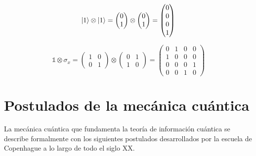 \begin{equation*}
    \ket{1} \otimes \ket{1}
    = \begin{pmatrix} 0\\1 \end{pmatrix} \otimes \begin{pmatrix} 0\\1 \end{pmatrix}
    = \begin{pmatrix} 0\\0\\0\\1 \end{pmatrix}
\end{equation*}

\begin{equation*}
    \mathds{1} \otimes \sigma_x
    = \begin{pmatrix}
        1 & 0 \\
        0 & 1
        \end{pmatrix} \otimes
        \begin{pmatrix}
            0 & 1 \\
            1 & 0
        \end{pmatrix}
    = \begin{pmatrix}
        0 & 1 & 0 & 0 \\
        1 & 0 & 0 & 0 \\
        0 & 0 & 0 & 1 \\
        0 & 0 & 1 & 0
    \end{pmatrix}
\end{equation*}

\section{Postulados de la mecánica cuántica}

La mecánica cuántica que fundamenta la teoría de información cuántica se describe formalmente con los siguientes postulados desarrollados por la escuela de Copenhague a lo largo de todo el siglo XX.

